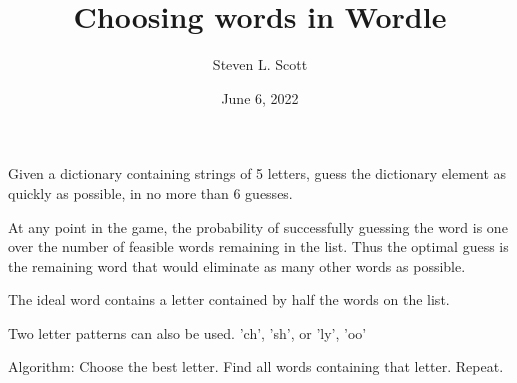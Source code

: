 \documentclass[11pt]{article}
\title{Choosing words in Wordle}
\author{Steven L. Scott}
\date{June 6, 2022}
\begin{document}
\maketitle

Given a dictionary containing strings of 5 letters, guess the dictionary element
as quickly as possible, in no more than 6 guesses.

At any point in the game, the probability of successfully guessing the word is
one over the number of feasible words remaining in the list.  Thus the optimal
guess is the remaining word that would eliminate as many other words as
possible.

The ideal word contains a letter contained by half the words on the list.

Two letter patterns can also be used.  'ch', 'sh', or 'ly', 'oo'

Algorithm:
Choose the best letter.  Find all words containing that letter.  Repeat.
\end{document}
